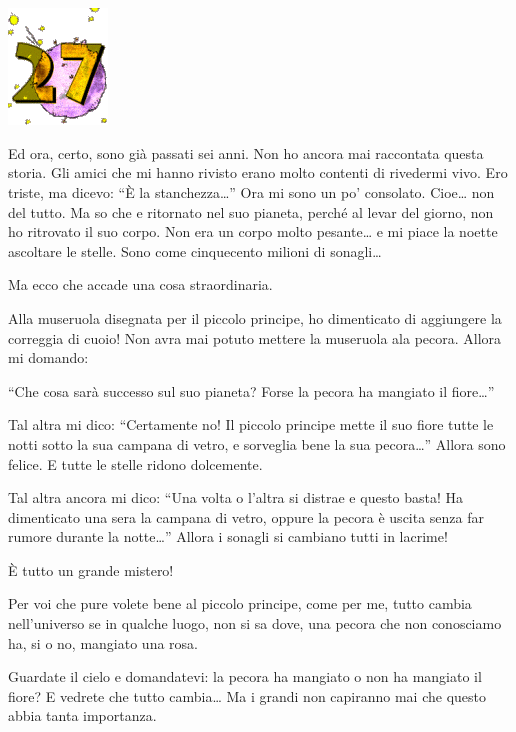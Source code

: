 \documentclass[11pt]{scrbook}
\begin{document}
\chapter{}
\begin{center}
\includegraphics{img/chapter27}
\end{center}

Ed ora, certo, sono già passati sei anni. Non ho ancora mai raccontata
questa storia. Gli amici che mi hanno rivisto erano molto contenti di
rivedermi vivo. Ero triste, ma dicevo: ``È la stanchezza\ldots{}'' Ora
mi sono un po' consolato. Cioe\ldots{} non del tutto. Ma so che e
ritornato nel suo pianeta, perché al levar del giorno, non ho ritrovato
il suo corpo. Non era un corpo molto pesante\ldots{} e mi piace la
noette ascoltare le stelle. Sono come cinquecento milioni di
sonagli\ldots{}

Ma ecco che accade una cosa straordinaria.

Alla museruola disegnata per il piccolo principe, ho dimenticato di
aggiungere la correggia di cuoio! Non avra mai potuto mettere la
museruola ala pecora. Allora mi domando:

``Che cosa sarà successo sul suo pianeta? Forse la pecora ha mangiato il
fiore\ldots{}''

Tal altra mi dico: ``Certamente no! Il piccolo principe mette il suo
fiore tutte le notti sotto la sua campana di vetro, e sorveglia bene la
sua pecora\ldots{}'' Allora sono felice. E tutte le stelle ridono
dolcemente.

Tal altra ancora mi dico: ``Una volta o l'altra si distrae e questo
basta! Ha dimenticato una sera la campana di vetro, oppure la pecora è
uscita senza far rumore durante la notte\ldots{}'' Allora i sonagli si
cambiano tutti in lacrime!

È tutto un grande mistero!

Per voi che pure volete bene al piccolo principe, come per me, tutto
cambia nell'universo se in qualche luogo, non si sa dove, una pecora che
non conosciamo ha, si o no, mangiato una rosa.

Guardate il cielo e domandatevi: la pecora ha mangiato o non ha mangiato
il fiore? E vedrete che tutto cambia\ldots{} Ma i grandi non capiranno mai
che questo abbia tanta importanza.
\end{document}
